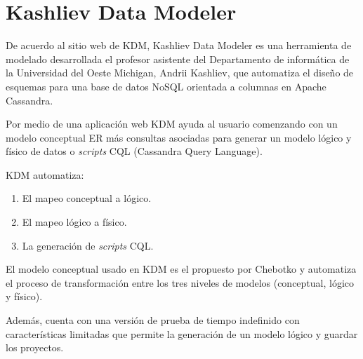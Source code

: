 \section{Kashliev Data Modeler}
De acuerdo al sitio web de KDM\cite{datafluent_kashliev_2020}, Kashliev Data Modeler es una herramienta de modelado desarrollada el profesor asistente del Departamento de informática de la Universidad del Oeste Michigan, Andrii Kashliev, que automatiza el diseño de esquemas para una base de datos NoSQL orientada a columnas en Apache Cassandra. 


Por medio de una aplicación web KDM ayuda al usuario comenzando con un modelo conceptual ER más consultas asociadas para generar un modelo lógico y físico de datos o \textit{scripts} CQL (Cassandra Query Language). 


KDM automatiza: 

\begin{enumerate}
    \item El mapeo conceptual a lógico.
    \item El mapeo lógico a físico.
    \item La generación de \textit{scripts} CQL.
\end{enumerate}

El modelo conceptual usado en KDM es el propuesto por Chebotko\cite{chebotko_big_2015} y automatiza el proceso de transformación entre los tres niveles de modelos (conceptual, lógico y físico).


Además, cuenta con una versión de prueba de tiempo indefinido con características limitadas que permite la generación de un modelo lógico y guardar los proyectos.

